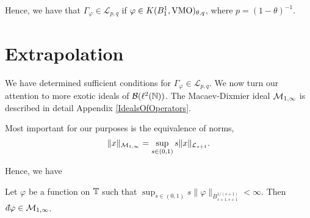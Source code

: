 \begin{corollary}
    Hence, we have that $\Gamma_\varphi \in \mathcal{L}_{p,q}$
    if $\varphi \in K(B_1^1,\operatorname{VMO})_{\theta,q}$, where $p = (1-\theta)^{-1}$.
\end{corollary}

\section{Extrapolation}
We have determined sufficient conditions for $\Gamma_\varphi \in \mathcal{L}_{p,q}$.
We now turn our attention to more exotic ideals of $\mathcal{B}(\ell^2(\mathbb{N}))$. The
Macaev-Dixmier ideal $\mathcal{M}_{1,\infty}$ is described in detail Appendix \ref{IdealsOfOperators}.

Most important for our purposes is the equivalence of norms,
\begin{equation}
    \|x\|_{\mathcal{M}_{1,\infty}} = \sup_{s \in (0,1)} s\|x\|_{\mathcal{L}_{s+1}}.
\end{equation}

Hence, we have
\begin{proposition}
    Let $\varphi$ be a function on $\mathbb{T}$ such that $\sup_{s \in (0,1)} s\|\varphi\|_{B_{s+1,s+1}^{1/(s+1)}} < \infty$.
    Then $\qd \varphi \in \M_{1,\infty}$.
\end{proposition}   

